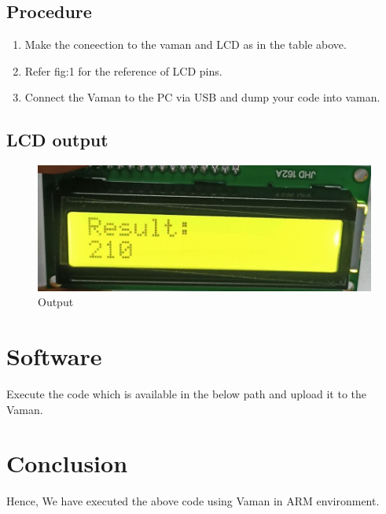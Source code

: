 \documentclass[10pt,a4paper]{article}
\begin{document}
     \subsection{Procedure}
     \begin{enumerate}
	     \item Make the coneection to the vaman and LCD as in the table above.
	     \item Refer fig:1 for the reference of LCD pins.
	     \item Connect the Vaman to the PC via USB and dump your code into vaman.
     \end{enumerate}
     \subsection{LCD output}
     \begin{figure}[H]
	     \centering
	     \includegraphics[scale=0.5]{figs/lcd1.jpg}
	     \caption{Output}
	     \label{fig:output}
     \end{figure}
     \section{Software}
	Execute the code which is available in the below path and upload it to the Vaman. \\
     \section{Conclusion}
	Hence, We have executed the above code using Vaman in ARM environment.
\end{document}
